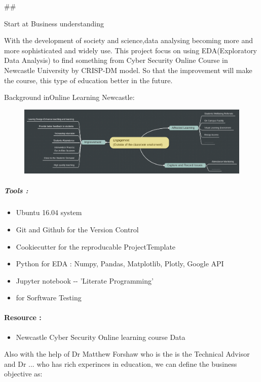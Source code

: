 \documentclass[11pt]{article}
\makeatletter
\def\maxwidth{\ifdim\Gin@nat@width>\linewidth\linewidth
    \else\Gin@nat@width\fi}
\let\Oldincludegraphics\includegraphics
\renewcommand{\includegraphics}[1]{\Oldincludegraphics[width=.8\maxwidth]{#1}}
\providecommand{\tightlist}{%
      \setlength{\itemsep}{0pt}\setlength{\parskip}{0pt}}
\makeatother
\begin{document}
    \#\#

Start at Business understanding 

    With the development of society and science,data analysing becoming more
and more sophisticated and widely use. This project focus on using
EDA(Exploratory Data Analysis) to find something from Cyber Security
Online Course in Newcastle University by CRISP-DM model. So that the
improvement will make the course, this type of education better in the
future.

Background inOnline Learning Newcastle:

\begin{figure}
\centering
\includegraphics{../reports/figures/bgs.png}
\caption{}
\end{figure}

    \subparagraph{Tools :}\label{tools}

\begin{itemize}
\tightlist
\item
  Ubuntu 16.04 system
\item
  Git and Github for the Version Control
\item
  Cookiecutter for the reproducable ProjectTemplate
\item
  Python for EDA : Numpy, Pandas, Matplotlib, Plotly, Google API
\item
  Jupyter notebook -\/- 'Literate Programming'
\item
  for Sorftware Testing
\end{itemize}

\paragraph{Resource :}\label{resource}

\begin{itemize}
\tightlist
\item
  Newcastle Cyber Security Online learning course Data
\end{itemize}

    Also with the help of Dr Matthew Forshaw who is the is the Technical
Advisor and Dr ... who has rich experinces in education, we can define
the business objective as:
\end{document}
